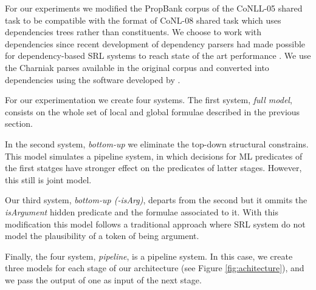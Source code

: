 
For our experiments we modified the PropBank corpus of the CoNLL-05 shared task 
\citep{carreras05introduction} to be compatible with the format of CoNL-08 
shared task \citep{surdeanu08conll} which uses dependencies trees rather than 
constituents. 
We choose to work with dependencies since recent development of dependency parsers had made possible for dependency-based SRL systems
to reach state of the art performance \citep{johansson08dependency}. 
We use the Charniak parses available in the original corpus and 
converted into dependencies using the software developed by 
\citet{johansson07conversion}. 

For our experimentation we create four systems. The first system, \emph{full model}, consists on the whole set of local and global formulae described in the previous section. 

In the second system, \emph{bottom-up} we eliminate the top-down structural constrains. This model simulates a  
pipeline system, in which decisions for ML predicates of the first statges have
stronger effect on the predicates of latter stages. However, this still is
joint model. 

Our third system, \emph{bottom-up (-isArg)}, departs from the second but it ommits the \emph{isArgument} hidden predicate and the formulae associated to it. With this modification this model follows a traditional approach where SRL system do not model the plausibility of a token of being argument.

Finally, the four system, \emph{pipeline}, is a pipeline system. In this case, we
create three models for each stage of our architecture (see Figure \ref{fig:achitecture}), and we pass the output of one as input of the next stage.
